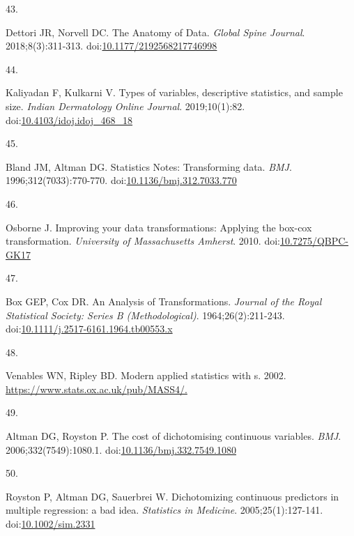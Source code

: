 \documentclass[
]{book}
\newlength{\cslhangindent}
\newlength{\csllabelwidth}
\newlength{\cslentryspacingunit} %
\newenvironment{CSLReferences}[2] %
 {%
  \setlength{\parindent}{0pt}
  \ifodd #1
  \let\oldpar\par
  \def\par{\hangindent=\cslhangindent\oldpar}
  \fi
  \setlength{\parskip}{#2\cslentryspacingunit}
 }%
 {}
\newcommand{\CSLLeftMargin}[1]{\parbox[t]{\csllabelwidth}{#1}}
\newcommand{\CSLRightInline}[1]{\parbox[t]{\linewidth - \csllabelwidth}{#1}\break}
\begin{document}
\begin{CSLReferences}{0}{0}
\leavevmode{}%
\CSLLeftMargin{43. }%
\CSLRightInline{Dettori JR, Norvell DC. The Anatomy of Data. \emph{Global Spine Journal}. 2018;8(3):311-313. doi:\href{https://doi.org/10.1177/2192568217746998}{10.1177/2192568217746998}}

\leavevmode{}%
\CSLLeftMargin{44. }%
\CSLRightInline{Kaliyadan F, Kulkarni V. Types of variables, descriptive statistics, and sample size. \emph{Indian Dermatology Online Journal}. 2019;10(1):82. doi:\href{https://doi.org/10.4103/idoj.idoj_468_18}{10.4103/idoj.idoj\_468\_18}}

\leavevmode{}%
\CSLLeftMargin{45. }%
\CSLRightInline{Bland JM, Altman DG. Statistics Notes: Transforming data. \emph{BMJ}. 1996;312(7033):770-770. doi:\href{https://doi.org/10.1136/bmj.312.7033.770}{10.1136/bmj.312.7033.770}}

\leavevmode{}%
\CSLLeftMargin{46. }%
\CSLRightInline{Osborne J. Improving your data transformations: Applying the box-cox transformation. \emph{University of Massachusetts Amherst}. 2010. doi:\href{https://doi.org/10.7275/QBPC-GK17}{10.7275/QBPC-GK17}}

\leavevmode{}%
\CSLLeftMargin{47. }%
\CSLRightInline{Box GEP, Cox DR. An Analysis of Transformations. \emph{Journal of the Royal Statistical Society: Series B (Methodological)}. 1964;26(2):211-243. doi:\href{https://doi.org/10.1111/j.2517-6161.1964.tb00553.x}{10.1111/j.2517-6161.1964.tb00553.x}}

\leavevmode{}%
\CSLLeftMargin{48. }%
\CSLRightInline{Venables WN, Ripley BD. Modern applied statistics with s. 2002. \href{https://www.stats.ox.ac.uk/pub/MASS4/}{https://www.stats.ox.ac.uk/pub/MASS4/.}}

\leavevmode{}%
\CSLLeftMargin{49. }%
\CSLRightInline{Altman DG, Royston P. The cost of dichotomising continuous variables. \emph{BMJ}. 2006;332(7549):1080.1. doi:\href{https://doi.org/10.1136/bmj.332.7549.1080}{10.1136/bmj.332.7549.1080}}

\leavevmode{}%
\CSLLeftMargin{50. }%
\CSLRightInline{Royston P, Altman DG, Sauerbrei W. Dichotomizing continuous predictors in multiple regression: a bad idea. \emph{Statistics in Medicine}. 2005;25(1):127-141. doi:\href{https://doi.org/10.1002/sim.2331}{10.1002/sim.2331}}


\end{CSLReferences}
\end{document}
